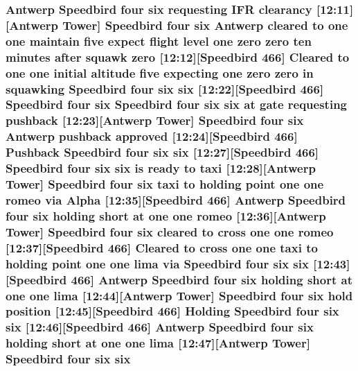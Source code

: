 \subsubsection[{\texorpdfstring{six}{six}}]{\setlength{\rightskip}{0pt plus 5cm}Antwerp Speedbird four six requesting I\+FR clearancy \mbox{[}12\+:11\mbox{]}\mbox{[}Antwerp {\bf Tower}\mbox{]} Speedbird four six Antwerp cleared to {\bf one} {\bf one} maintain five expect flight level {\bf one} {\bf zero} {\bf zero} {\bf ten} minutes after squawk {\bf zero} \mbox{[}12\+:12\mbox{]}\mbox{[}Speedbird 466\mbox{]} Cleared to {\bf one} {\bf one} initial altitude five expecting {\bf one} {\bf zero} {\bf zero} in {\bf squawking} Speedbird four six six \mbox{[}12\+:22\mbox{]}\mbox{[}Speedbird 466\mbox{]} Speedbird four six Speedbird four six six at gate requesting pushback \mbox{[}12\+:23\mbox{]}\mbox{[}Antwerp {\bf Tower}\mbox{]} Speedbird four six Antwerp pushback {\bf approved} \mbox{[}12\+:24\mbox{]}\mbox{[}Speedbird 466\mbox{]} Pushback Speedbird four six six \mbox{[}12\+:27\mbox{]}\mbox{[}Speedbird 466\mbox{]} Speedbird four six six is ready to taxi \mbox{[}12\+:28\mbox{]}\mbox{[}Antwerp {\bf Tower}\mbox{]} Speedbird four six taxi to holding point {\bf one} {\bf one} {\bf romeo} via {\bf Alpha} \mbox{[}12\+:35\mbox{]}\mbox{[}Speedbird 466\mbox{]} Antwerp Speedbird four six holding short at {\bf one} {\bf one} {\bf romeo} \mbox{[}12\+:36\mbox{]}\mbox{[}Antwerp {\bf Tower}\mbox{]} Speedbird four six cleared to cross {\bf one} {\bf one} {\bf romeo} \mbox{[}12\+:37\mbox{]}\mbox{[}Speedbird 466\mbox{]} Cleared to cross {\bf one} {\bf one} taxi to holding point {\bf one} {\bf one} {\bf lima} via Speedbird four six six \mbox{[}12\+:43\mbox{]}\mbox{[}Speedbird 466\mbox{]} Antwerp Speedbird four six holding short at {\bf one} {\bf one} {\bf lima} \mbox{[}12\+:44\mbox{]}\mbox{[}Antwerp {\bf Tower}\mbox{]} Speedbird four six hold {\bf position} \mbox{[}12\+:45\mbox{]}\mbox{[}Speedbird 466\mbox{]} Holding Speedbird four six six \mbox{[}12\+:46\mbox{]}\mbox{[}Speedbird 466\mbox{]} Antwerp Speedbird four six holding short at {\bf one} {\bf one} {\bf lima} \mbox{[}12\+:47\mbox{]}\mbox{[}Antwerp {\bf Tower}\mbox{]} Speedbird four six six}\hypertarget{happyDay4ExpectedATC_8txt_a3279acb4484698e3b3b90d6a4e9c0c32}{}\label{happyDay4ExpectedATC_8txt_a3279acb4484698e3b3b90d6a4e9c0c32}

